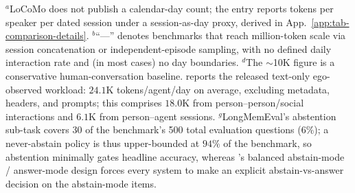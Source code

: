 \begin{table}[t]
\vspace{4pt}
\raggedright\scriptsize
$^a$LoCoMo does not publish a calendar-day count; the entry reports tokens per speaker per dated session under a session-as-day proxy, derived in App.~\ref{app:tab-comparison-details}.
$^b$``---'' denotes benchmarks that reach million-token scale via session concatenation or independent-episode sampling, with no defined daily interaction rate and (in most cases) no day boundaries.
$^d$The ${\sim}$10K figure is a conservative human-conversation baseline. \benchmark reports the released text-only ego-observed workload: $24.1$K tokens/agent/day on average, excluding metadata, headers, and prompts; this comprises $18.0$K from person--person/social interactions and $6.1$K from person--agent sessions.
$^g$LongMemEval's abstention sub-task covers 30 of the benchmark's 500 total evaluation questions ($6\%$); a never-abstain policy is thus upper-bounded at $94\%$ of the benchmark, so abstention minimally gates headline accuracy, whereas \DFiveID's balanced abstain-mode / answer-mode design forces every system to make an explicit abstain-vs-answer decision on the abstain-mode items.

\vspace{-6pt}
\end{table}
